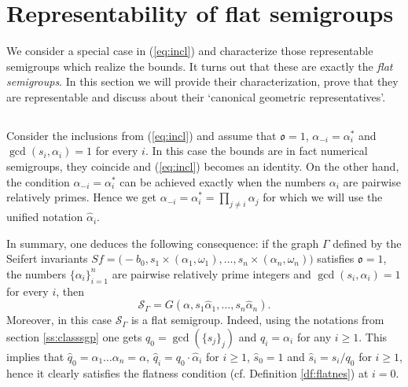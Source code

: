 \documentclass[oneside]{amsart}
\numberwithin{equation}{section}
\numberwithin{equation}{subsection}
\theoremstyle{plain}
\theoremstyle{definition}
\newcommand{\w}{\omega}
\newcommand{\al}{\alpha}
\newcommand{\Se}{\mathcal{S}}
\newcommand{\G}{\Gamma}
\newcommand{\oo}{\mathfrak{o}}
\newcommand{\q}{q}
\newcommand{\z}[1]{\widehat{#1}}
\begin{document}
\section{Representability of flat semigroups}{\label{sec:flat}}
We consider a special case in (\ref{eq:incl}) and characterize those  representable semigroups
which realize the bounds. It turns out that these are exactly the {\em flat semigroups}. In this section we will provide their characterization, prove that they are representable and discuss about their `canonical geometric representatives'.

\subsection{}
Consider the inclusions from (\ref{eq:incl}) and assume that $\oo=1$, $\al_{-i}=\al^*_i$  and $\gcd(s_i,\al_i)=1$ for every $i$. In this case the bounds are in fact numerical semigroups, they coincide and  (\ref{eq:incl}) becomes an identity. On the other hand, the condition $\al_{-i}=\al^*_i$  can be achieved exactly when the 
numbers $\al_i$ are pairwise relatively primes. Hence we get  $\al_{-i}=\al^*_i=\prod_{j\neq i}\al_j$ for which we will use the unified notation $\z{\al}_i$. 

In summary, one deduces 
the following consequence: 
if the graph $\Gamma$ defined by the Seifert invariants
$
     Sf=\big(-b_0,s_1\times(\al_1,\w_1),\dots,s_n\times(\al_n,\w_n)\big)    
$
satisfies $\oo=1$,  the numbers $\{\al_i\}_{i=1}^n$ are 
pairwise relatively prime integers and $\gcd(s_i,\al_i)=1$ for every $i$, 
then 
\begin{equation}
    \label{eq:sg_flat}
    \Se_\G=G(\al,s_1\z{\al}_1,\dots,s_n\z{\al}_n). 
\end{equation}
Moreover, in this case $\Se_\G$ is a flat semigroup.
Indeed, using  the notations from section \ref{ss:classsgp} one gets
$\q_0=\gcd(\{s_j\}_j)$ and $q_i=\al_i$ for any $i\geq 1$. This implies that  $\widehat{q}_0=\al_1\dots\al_n=\alpha$, $\widehat{q}_i=q_0\cdot\widehat{\al}_i$ for $i\geq 1$, $\widehat{s}_0=1$ and $\widehat{s}_i=s_i/q_0$ for $i\geq 1$, 
hence it clearly satisfies the flatness condition (cf. Definition \ref{df:flatnes}) at $i=0$.
\vspace{0.2cm}
\end{document}
